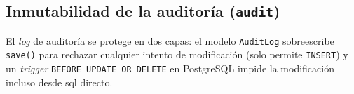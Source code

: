 \subsection{Inmutabilidad de la auditoría (\texttt{audit})}

El \textit{log} de auditoría se protege en dos capas: el modelo
\texttt{AuditLog} sobreescribe \texttt{save()} para rechazar cualquier
intento de modificación (solo permite \texttt{INSERT}) y un
\textit{trigger} \texttt{BEFORE UPDATE OR DELETE} en PostgreSQL
impide la modificación incluso desde \acs{sql} directo.

